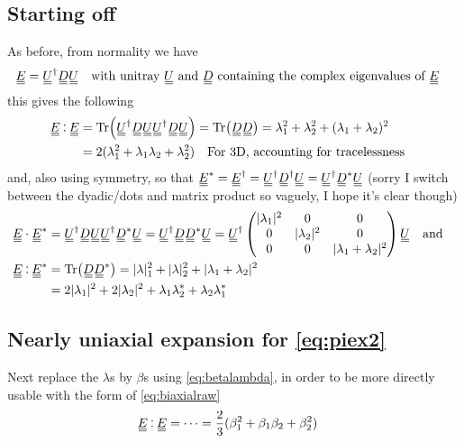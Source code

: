 \documentclass[11pt]{article}
\begin{document}
\subsection{Starting off}
As before, from normality we have
\begin{equation}
    \du{E} = \du{U}^\dagger \du{D} \du{U} \qq{with unitray $\du{U}$ and $\du{D}$ containing the complex eigenvalues of \EE}
\end{equation}
    this gives the following
\begin{align}
    \du{E} \cddot \du{E} &= \Tr(\du{U}^\dagger \du{D} \du{U} \du{U}^\dagger \du{D} \du{U}) = \Tr(\du{D}\du{D}) = \lambda_1^2 + \lambda_2^2 + (\lambda_1 + \lambda_2)^2 \\
    &= 2(\lambda_1^2 +\lambda_1\lambda_2 + \lambda_2^2) \qq{For 3D, accounting for tracelessness} \\
\end{align}
and, also using symmetry, so that $\du{E}^* = \du{E}^\dagger = \du{U}^\dagger \du{D}^\dagger \du{U} = \du{U}^\dagger \du{D}^* \du{U}$ (sorry I switch between the dyadic/dots and matrix product so vaguely, I hope it's clear though)
\begin{align}
    \du{E} \cdot \du{E}^* &=  \du{U}^\dagger \du{D} \du{U} \du{U}^\dagger \du{D}^* \du{U} = \du{U}^\dagger \du{D}\du{D}^* \du{U} = \du{U}^\dagger \begin{pmatrix} |\lambda_1|^2 & 0 & 0 \\ 0 & |\lambda_2|^2 & 0 \\ 0 & 0 & |\lambda_1 + \lambda_2|^2 \\ \end{pmatrix} \du{U} \qq{and} \\
    \du{E} \cddot \du{E}^* &=  \Tr(\du{D}\du{D}^*) = |\lambda|_1^2 + |\lambda|_2^2 + |\lambda_1 + \lambda_2|^2 \\
    &= 2|\lambda_1|^2 + 2|\lambda_2|^2 + \lambda_1\lambda_2^* + \lambda_2\lambda_1^*
\end{align}

\subsection{Nearly uniaxial expansion for \cref{eq:piex2}}
Next replace the $\lambda$s by $\beta$s using \cref{eq:betalambda}, in order to be more directly usable with the form of \cref{eq:biaxialraw}
\begin{align}
    \du{E} \cddot \du{E} &= \cdots = \frac{2}{3}(\beta_1^2 + \beta_1\beta_2 + \beta_2^2)
\end{align}
\end{document}
